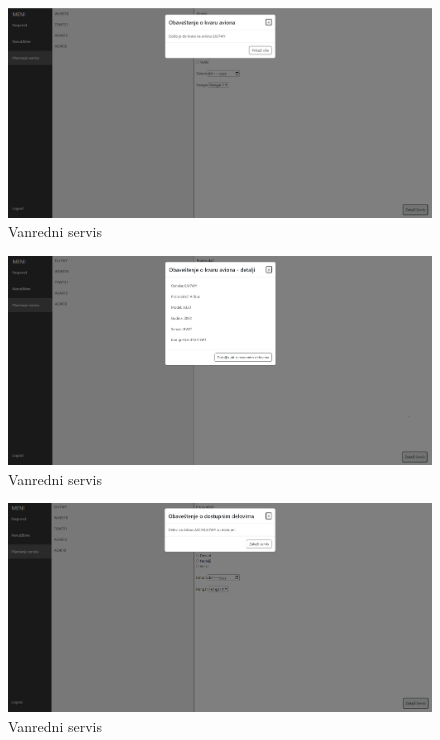 \documentclass[a4paper]{article}
\begin{document}
\begin{figure}[H]
\begin{center}
\includegraphics[scale=0.3]{UI/vandredni_servis_1.png}
\end{center}
\caption{Vanredni servis}
\label{fig:ui_vanredni_1}
\end{figure}

\begin{figure}[H]
\begin{center}
\includegraphics[scale=0.3]{UI/vandredni_servis_2.png}
\end{center}
\caption{Vanredni servis}
\label{fig:ui_vanredni_2}
\end{figure}

\begin{figure}[H]
\begin{center}
\includegraphics[scale=0.3]{UI/vandredni_servis_3.png}
\end{center}
\caption{Vanredni servis}
\label{fig:ui_vanredni_3}
\end{figure}
\end{document}
